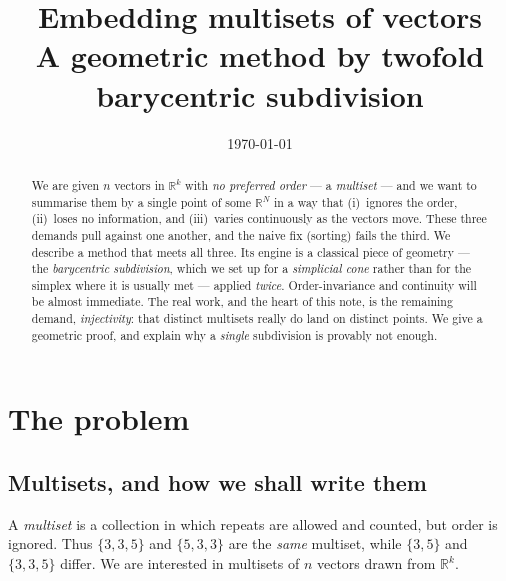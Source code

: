 \documentclass[11pt,a4paper]{article}
\title{\bfseries Embedding multisets of vectors\\[2pt]
       \large A geometric method by twofold barycentric subdivision}
\author{}
\date{\today}
\theoremstyle{definition}
\theoremstyle{plain}
\newcommand{\R}{\mathbb{R}}
\begin{document}
\maketitle

\begin{abstract}
\noindent
We are given $n$ vectors in $\R^k$ with \emph{no preferred order} --- a
\emph{multiset} --- and we want to summarise them by a single point of some
$\R^N$ in a way that (i)~ignores the order, (ii)~loses no information, and
(iii)~varies continuously as the vectors move.  These three demands pull
against one another, and the naive fix (sorting) fails the third.  We describe a
method that meets all three.  Its engine is a classical piece of geometry ---
the \emph{barycentric subdivision}, which we set up for a \emph{simplicial
cone} rather than for the simplex where it is usually met --- applied
\emph{twice}.
Order-invariance and continuity will be almost immediate.  The real work, and the
heart of this note, is the remaining demand, \emph{injectivity}: that distinct
multisets really do land on distinct points.  We give a geometric proof, and explain why a
\emph{single} subdivision is provably not enough.
\end{abstract}

\tableofcontents
\bigskip

\section{The problem}
\label{sec:problem}

\subsection{Multisets, and how we shall write them}

A \emph{multiset} is a collection in which repeats are allowed and counted, but
order is ignored.  Thus $\{3,3,5\}$ and $\{5,3,3\}$ are the \emph{same}
multiset, while $\{3,5\}$ and $\{3,3,5\}$ differ.  We are interested in
multisets of $n$ vectors drawn from $\R^k$.
\end{document}
